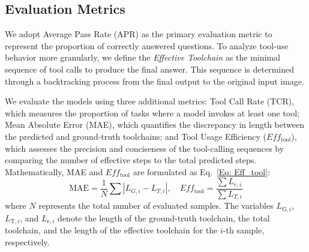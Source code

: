 \documentclass[runningheads]{llncs}
\begin{document}
\subsection{Evaluation Metrics}\label{sec:evaluation_metrics}

We adopt Average Pass Rate (APR) as the primary evaluation metric to represent the proportion of correctly answered questions. 
To analyze tool-use behavior more granularly, we define the \textit{Effective Toolchain} as the minimal sequence of tool calls to produce the final answer. 
This sequence is determined through a backtracking process from the final output to the original input image.

We evaluate the models using three additional metrics: Tool Call Rate (TCR), which measures the proportion of tasks where a model invokes at least one tool; Mean Absolute Error (MAE), which quantifies the discrepancy in length between the predicted and ground-truth toolchains; and Tool Usage Efficiency ($Eff_{\text{tool}}$), which assesses the precision and conciseness of the tool-calling sequences by comparing the number of effective steps to the total predicted steps. 
Mathematically, MAE and $Eff_{\text{tool}}$ are formulated as Eq.~\ref{Eq: Eff_tool}:
\begin{equation}\label{Eq: Eff_tool}
 \text{MAE} = \frac{1}{N} \sum |L_{G, i} - L_{T, i}|, \quad Eff_{\text{tool}} =  \frac{\sum L_{e, i}}{ \sum L_{T, i}}
\end{equation}
where $N$ represents the total number of evaluated samples. The variables $L_{\text{G}, i}$, $L_{\text{T}, i}$, and $L_{\text{e}, i}$ denote the length of the ground-truth toolchain, the total toolchain, and the length of the effective toolchain for the $i$-th sample, respectively.
\end{document}
